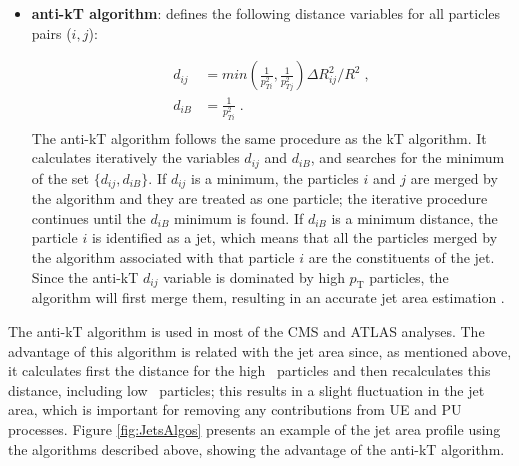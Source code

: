 \begin{itemize}
 \item \textbf{anti-kT algorithm}: defines the following distance variables for all particles pairs ($i,j$):

 \begin{equation}   \label{eq:antikt}
 \begin{aligned}
  d_{ij} &= min\left(\frac{1}{p_{Ti}^{2}},\frac{1}{p_{Tj}^{2}}\right)\Delta R_{ij}^{2}/R^{2} \;,\\
  d_{iB} &= \frac{1}{p_{Ti}^{2}} \;. \\
  \end{aligned}
  \end{equation}
\noindent The anti-kT algorithm follows the same procedure as the kT algorithm. It calculates 
iteratively the variables $d_{ij}$ and $d_{iB}$, and searches 
for the minimum of the set $\{d_{ij},d_{iB}\}$. If $d_{ij}$ is a minimum, the 
particles $i$ and $j$ are merged by the algorithm and they are treated as one 
particle; the iterative procedure continues until the $d_{iB}$ minimum is found. If $d_{iB}$ is a
minimum distance, the particle $i$ is identified as a jet, which means that
all the particles merged by the algorithm associated with that particle $i$ 
are the constituents of the jet. Since the anti-kT $d_{ij}$  variable is 
dominated by high $p_{\textrm{T}}$ particles, the algorithm will first merge them, resulting 
in an accurate jet area estimation \cite{AntiKTAlgorithm}. %
\end{itemize}

\noindent The anti-kT algorithm is used in most of the CMS and ATLAS analyses. The advantage of  
this algorithm is related with the jet area since, as mentioned above, it calculates first 
the distance for the high \pt~particles and then recalculates 
this distance, including low \pt~particles; this results in a slight 
fluctuation in the jet area, which is important for removing any 
contributions from UE and PU processes. Figure \ref{fig:JetsAlgos} presents an example of 
the jet area profile using the algorithms described above, showing the 
advantage of the anti-kT algorithm. \\

